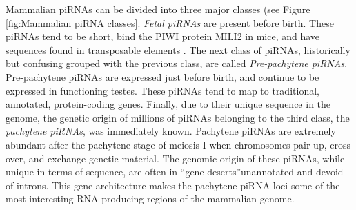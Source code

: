       Mammalian piRNAs can be divided into three major classes (see Figure \ref{fig:Mammalian piRNA classes}. \textit{Fetal piRNAs} are present before birth. These piRNAs tend to be short, bind the PIWI protein MILI2 in mice, and have sequences found in transposable elements \citep{Carmell2007}. The next class of piRNAs, historically but confusing grouped with the previous class, are called \textit{Pre-pachytene piRNAs}. Pre-pachytene piRNAs are expressed just before birth, and continue to be expressed in functioning testes. These piRNAs tend to map to traditional, annotated, protein-coding genes. Finally, due to their unique sequence in the genome, the genetic origin of millions of piRNAs belonging to the third class, the \textit{pachytene piRNAs}, was immediately known. Pachytene piRNAs are extremely abundant after the pachytene stage of meiosis I when chromosomes pair up, cross over, and exchange genetic material. The genomic origin of these piRNAs, while unique in terms of sequence, are often in ``gene deserts''\textendash unannotated and devoid of introns. This gene architecture makes the pachytene piRNA loci some of the most interesting RNA-producing regions of the mammalian genome.

